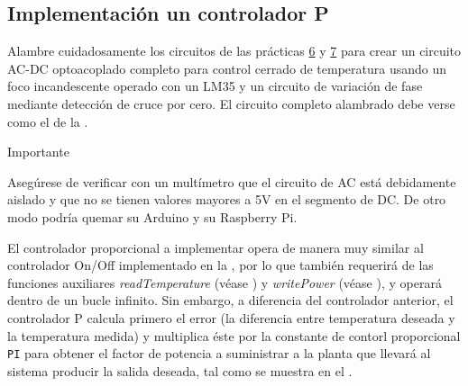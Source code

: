 %
%


\subsection{Implementación un controlador P}%
\label{sec:step-2}

Alambre cuidadosamente los circuitos de las prácticas \href{https://github.com/kyordhel/FSEm/tree/master/practica06}{6} y \href{https://github.com/kyordhel/FSEm/tree/master/practica07}{7} para crear un circuito AC-DC optoacoplado completo para control cerrado de temperatura usando un foco incandescente operado con un LM35 y un circuito de variación de fase mediante detección de cruce por cero.
El circuito completo alambrado debe verse como el de la .

\medskip

\begin{importantbox}{\large Importante}
	\begin{center}
		Asegúrese de verificar con un multímetro que el circuito de AC está debidamente aislado y que no se tienen valores mayores a 5V en el segmento de DC.
		De otro modo podría quemar su Arduino y su Raspberry Pi.
	\end{center}
\end{importantbox}

\medskip

El controlador proporcional a implementar opera de manera muy similar al controlador On/Off implementado en la , por lo que también requerirá de las funciones auxiliares \emph{readTemperature} (véase ) y \emph{writePower} (véase ), y operará dentro de un bucle infinito.
Sin embargo, a diferencia del controlador anterior, el controlador P calcula primero el error (la diferencia entre temperatura deseada y la temperatura medida) y multiplica éste por la constante de contorl proporcional \texttt{PI} para obtener el factor de potencia a suministrar a la planta que llevará al sistema producir la salida deseada, tal como se muestra en el .

\begin{minipage}{\linewidth}%

\end{minipage}

